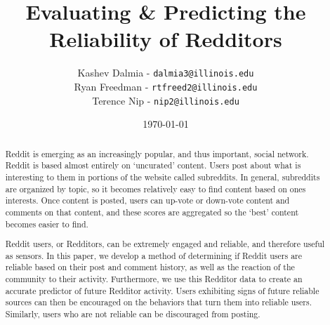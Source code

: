\documentclass[a4paper]{article}
\title{Evaluating \& Predicting the Reliability of Redditors}
\author{Kashev Dalmia - \texttt{dalmia3@illinois.edu} \\
        Ryan Freedman - \texttt{rtfreed2@illinois.edu} \\
        Terence Nip - \texttt{nip2@illinois.edu}
        }
\date{\today}
\begin{document}
\maketitle

\begin{abstract}

Reddit is emerging as an increasingly popular, and thus important, social
network. Reddit is based almost entirely on `uncurated' content. Users post
about what is interesting to them in portions of the website called subreddits.
In general, subreddits are organized by topic, so it becomes relatively easy to
find content based on ones interests. Once content is posted, users can up-vote
or down-vote content and comments on that content, and these scores are
aggregated so the `best' content becomes easier to find.

Reddit users, or Redditors, can be extremely engaged and reliable, and therefore
useful as sensors. In this paper, we develop a method of determining if Reddit
users are reliable based on their post and comment history, as well as the
reaction of the community to their activity. Furthermore, we use this Redditor
data to create an accurate predictor of future Redditor activity. Users
exhibiting signs of future reliable sources can then be encouraged on the
behaviors that turn them into reliable users. Similarly, users who are not
reliable can be discouraged from posting.

\end{abstract}
\end{document}
